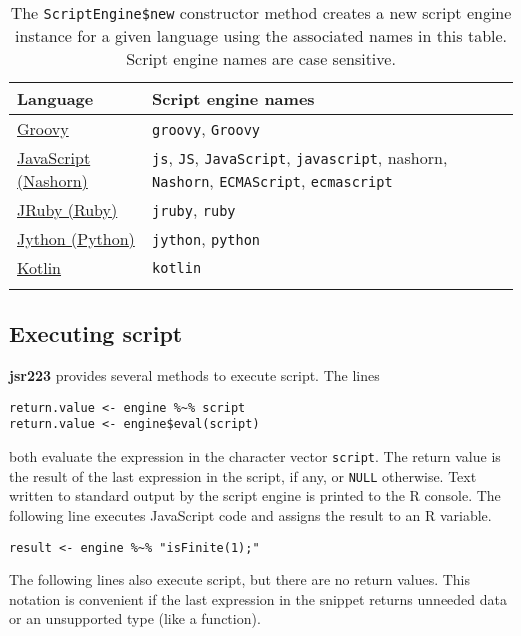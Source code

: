 \documentclass[
article,
11pt, %
a4paper, %
oneside, %
headinclude,footinclude, %
]{scrartcl}
\theoremstyle{definition} %
\theoremstyle{plain} %
\theoremstyle{remark} %
\newcommand{\pkg}[1]{\textbf{#1}}
\newcommand{\code}[1]{\texttt{#1}}
\begin{document}
\begin{table}[h]
    \small
    \centering
    \begin{tabular}{l p{8cm}}
        \toprule
        \textbf{Language} & \textbf{Script engine names} \\
        \midrule
        \noalign{\vspace{1ex}}
        \href{http://groovy-lang.org}{Groovy} &  \code{groovy}, \code{Groovy}\\[.25cm]
        \href{https://docs.oracle.com/javase/8/docs/technotes/guides/scripting/nashorn/}{JavaScript (Nashorn)} & \code{js}, \code{JS}, \code{JavaScript}, \code{javascript}, {nashorn}, \code{Nashorn}, \code{ECMAScript}, \code{ecmascript}\\[.25cm]
        \href{http://jruby.org}{JRuby (Ruby)} & \code{jruby}, \code{ruby}\\[.25cm]
        \href{http://www.jython.org}{Jython (Python)} & \code{jython}, \code{python}\\[.25cm]
        \href{https://kotlinlang.org/}{Kotlin} & \code{kotlin}\\
        \noalign{\vspace{1ex}}
        \bottomrule
    \end{tabular}
    \caption{The \code{ScriptEngine\$new} constructor method creates a new script engine instance for a given language using the associated names in this table. Script engine names are case sensitive.}
    \label{tab:script-engine-type-names}
\end{table}

\subsection{Executing script}

\pkg{jsr223} provides several methods to execute script. The lines

\begin{verbatim}
return.value <- engine %~% script
return.value <- engine$eval(script)
\end{verbatim}
both evaluate the expression in the character vector \code{script}. The return value is the result of the last expression in the script, if any, or \code{NULL} otherwise. Text written to standard output by the script engine is printed to the R console. The following line executes JavaScript code and assigns the result to an R variable.

\begin{verbatim}
result <- engine %~% "isFinite(1);"
\end{verbatim}
The following lines also execute script, but there are no return values. This notation is convenient if the last expression in the snippet returns unneeded data or an unsupported type (like a function).
\end{document}
